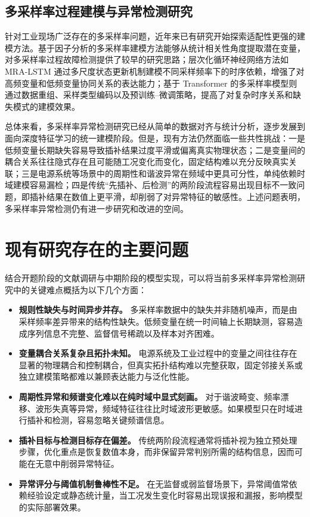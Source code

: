 \subsection{多采样率过程建模与异常检测研究}

针对工业现场广泛存在的多采样率问题，近年来已有研究开始探索适配性更强的建模方法。基于因子分析的多采样率建模方法能够从统计相关性角度提取潜在变量，对多采样率过程故障检测提供了较早的研究思路；层次化循环神经网络方法如 MRA-LSTM 通过多尺度状态更新机制建模不同采样频率下的时序依赖，增强了对高频变量和低频变量协同关系的表达能力；基于 Transformer 的多采样率模型则通过数据重组、采样类型编码以及预训练--微调策略，提高了对复杂时序关系和缺失模式的建模效果。

总体来看，多采样率异常检测研究已经从简单的数据对齐与统计分析，逐步发展到面向深度特征学习的统一建模阶段。但是，现有方法仍然面临一些共性挑战：一是低频变量长期缺失容易导致插补结果过度平滑或偏离真实物理状态；二是变量间的耦合关系往往隐式存在且可能随工况变化而变化，固定结构难以充分反映真实关联；三是电源系统等场景中的周期性和谐波异常在频域中更具可分性，单纯依赖时域建模容易漏检；四是传统``先插补、后检测''的两阶段流程容易出现目标不一致问题，即插补结果在数值上更平滑，却削弱了对异常特征的敏感性。上述问题表明，多采样率异常检测仍有进一步研究和改进的空间。

\section{现有研究存在的主要问题}

结合开题阶段的文献调研与中期阶段的模型实现，可以将当前多采样率异常检测研究中的关键难点概括为以下几个方面：

\begin{itemize}
    \item \textbf{规则性缺失与时间异步并存。} 多采样率数据中的缺失并非随机噪声，而是由采样频率差异带来的结构性缺失。低频变量在统一时间轴上长期缺测，容易造成序列信息不完整、监督信号稀疏以及样本对齐困难。
    \item \textbf{变量耦合关系复杂且拓扑未知。} 电源系统及工业过程中的变量之间往往存在显著的物理耦合和控制耦合，但真实拓扑结构难以完整获取，固定邻接关系或独立建模策略都难以兼顾表达能力与泛化性能。
    \item \textbf{周期性异常和频谱变化难以在纯时域中显式刻画。} 对于谐波畸变、频率漂移、波形失真等异常，频域特征往往比时域波形更敏感。如果模型只在时域进行插补和检测，容易忽略关键频谱信息。
    \item \textbf{插补目标与检测目标存在偏差。} 传统两阶段流程通常将插补视为独立预处理步骤，优化重点是恢复数值本身，而非保留异常判别所需的结构信息，因而可能在无意中削弱异常特征。
    \item \textbf{异常评分与阈值机制鲁棒性不足。} 在无监督或弱监督场景下，异常阈值常依赖经验设定或静态统计量，当工况发生变化时容易出现误报和漏报，影响模型的实际部署效果。
\end{itemize}

